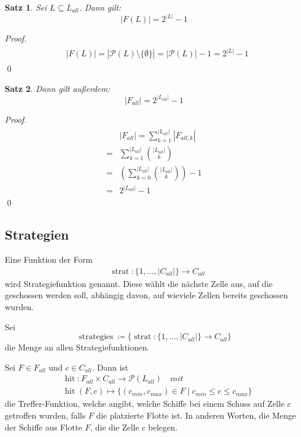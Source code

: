 \documentclass[a4paper,12pt]{llncs}
\numberwithin{equation}{section}
\newtheorem{satz}{Satz}
\DeclareMathOperator{\hit}{hit}
\DeclareMathOperator{\strat}{strat}
\DeclareMathOperator{\strategies}{strategies}
\begin{document}
\begin{satz}
Sei $L \subseteq L_{all}$.
Dann gilt:
\[
|F(L)|=2^{|L|} - 1
\]
\end{satz}

\begin{proof}
\begin{align}
\begin{split}
&|F(L)|=|\mathcal{P}(L) \setminus \{\emptyset\}|=|\mathcal{P}(L)|-1=2^{|L|} - 1
\end{split}
\end{align}
\qed
\end{proof}

\begin{satz}
Dann gilt außerdem:
\[
|F_{all}|=2^{|L_{all}|} - 1
\]
\end{satz}

\begin{proof}
\begin{align}
\begin{split}
&|F_{all}|=\sum_{k=1}^{|L_{all}|} |F_{all,k}|\\
=&\sum_{k=1}^{|L_{all}|} \binom{|L_{all}|}{k} \\
=&\left( \sum_{k=0}^{|L_{all}|} \binom{|L_{all}|}{k} \right) - 1 \\
=&2^{|L_{all}|} - 1
\end{split}
\end{align}
\qed
\end{proof}

\subsection{Strategien}

\begin{definition}
Eine Funktion der Form
\begin{align}
&\strat:\{1,\dots,|C_{all}|\} \rightarrow C_{all} \nonumber
\end{align}
wird Strategiefunktion genannt. Diese wählt die nächste Zelle aus, auf die geschossen werden soll, abhängig davon, auf wieviele Zellen bereits geschossen wurden.
\end{definition}

\begin{definition}
Sei
\[
\strategies  \coloneqq \{ \strat:\{1,\dots,|C_{all}|\} \rightarrow C_{all} \}
\]
die Menge an allen Strategiefunktionen.
\end{definition}

\begin{definition}
Sei $F \in F_{all}$ und $c \in C_{all}$.
Dann ist 
\begin{align}
&\hit:F_{all} \times C_{all} \rightarrow \mathcal{P}(L_{all}) \quad mit \nonumber\\
&\hit(F, c)\mapsto \{(c_{min}, c_{max}) \in F \mid c_{min} \leq c \leq c_{max}\} \nonumber
\end{align}
die Treffer-Funktion, welche angibt, welche Schiffe bei einem Schuss auf Zelle $c$ getroffen wurden, falls $F$ die platzierte Flotte ist. In anderen Worten, die Menge der Schiffe aus Flotte $F$, die die Zelle $c$ belegen.
\end{definition}
\end{document}
